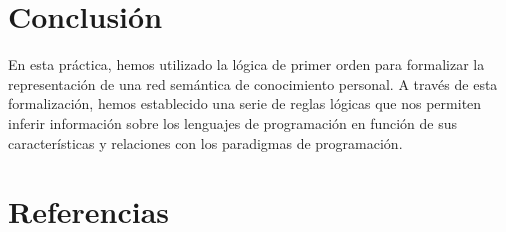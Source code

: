 \documentclass[11pt]{article}
\begin{document}
\section{Conclusión}
\label{sec:orgbdd7c05}
En esta práctica, hemos utilizado la lógica de primer orden para
formalizar la representación de una red semántica de conocimiento
personal. A través de esta formalización, hemos establecido una
serie de reglas lógicas que nos permiten inferir información sobre los
lenguajes de programación en función de sus características y
relaciones con los paradigmas de programación. 

\section{Referencias}
\label{sec:orgb880590}
\printbibliography[heading=none]
\end{document}
